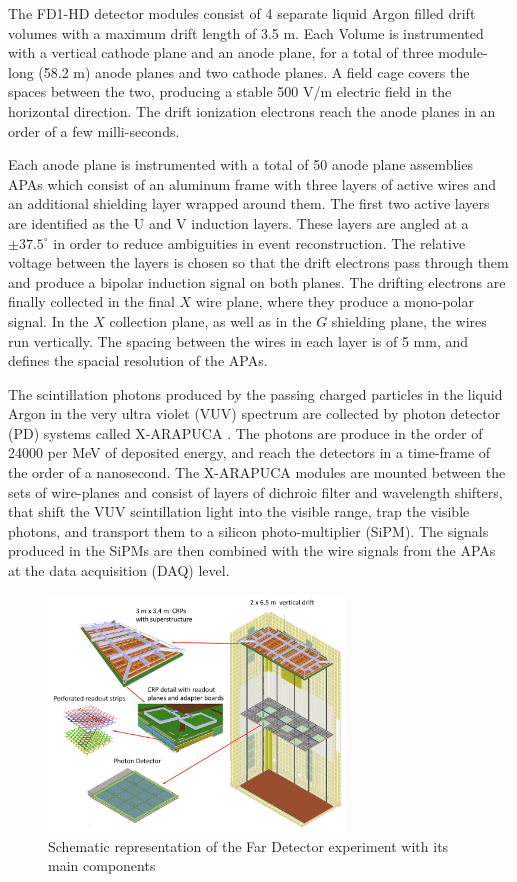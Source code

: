 The FD1-HD detector modules consist of 4 separate liquid Argon filled drift volumes with a maximum drift length of 3.5 m. Each Volume is instrumented with a vertical cathode plane and an anode plane, for a total of three module-long (58.2 m) anode planes and two cathode planes. A field cage covers the spaces between the two, producing a stable 500 V/m electric field in the horizontal direction. The drift ionization electrons reach the anode planes in an order of a few milli-seconds. 

Each anode plane is instrumented with a total of 50 anode plane assemblies APAs which consist of an aluminum frame with three layers of active wires and an additional shielding layer wrapped around them. The first two active layers are identified as the U and V induction layers. These layers are angled at a $\pm 37.5^\circ$ in order to reduce ambiguities in event reconstruction. The relative voltage between the layers is chosen so that the drift electrons pass through them and produce a bipolar induction signal on both planes. The drifting electrons are finally collected in the final $X$ wire plane, where they produce a mono-polar signal. In the $X$ collection plane, as well as in the $G$ shielding plane, the wires run vertically. The spacing between the wires in each layer is of 5 mm, and defines the spacial resolution of the APAs.

The scintillation photons produced by the passing charged particles in the liquid Argon in the very ultra violet (VUV) spectrum are collected by photon detector (PD) systems called X-ARAPUCA \cite{Segreto:2018jdx}. The photons are produce in the order of 24000 per MeV of deposited energy, and reach the detectors in a time-frame of the order of a nanosecond. The X-ARAPUCA modules are mounted between the sets of wire-planes and consist of layers of dichroic filter and wavelength shifters, that shift the VUV scintillation light into the visible range, trap the visible photons, and transport them to a silicon photo-multiplier (SiPM). The signals produced in the SiPMs are then combined with the wire signals from the APAs at the data acquisition (DAQ) level.

\begin{figure}[!t]
     \centering
     \includegraphics[width=0.7\textwidth]{figures/ch3-DUNE/setup_new_updated.png}
     \caption{Schematic representation of the Far Detector experiment with its main components}
        \label{fig:DUNEdiagram}
\end{figure}

